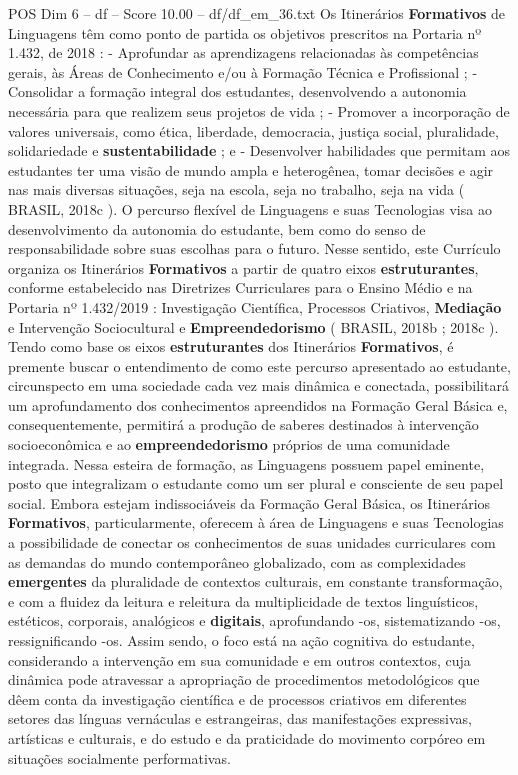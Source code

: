 \begin{textsample}{POS Dim 6 – df – Score 10.00 – df/df\_em\_36.txt}
Os Itinerários \textbf{Formativos} de Linguagens têm como ponto de partida os objetivos prescritos na Portaria nº 1.432, de 2018 : - Aprofundar as aprendizagens relacionadas às competências gerais, às Áreas de Conhecimento e/ou à Formação Técnica e Profissional ; - Consolidar a formação integral dos estudantes, desenvolvendo a autonomia necessária para que realizem seus projetos de vida ; - Promover a incorporação de valores universais, como ética, liberdade, democracia, justiça social, pluralidade, solidariedade e \textbf{sustentabilidade} ; e - Desenvolver habilidades que permitam aos estudantes ter uma visão de mundo ampla e heterogênea, tomar decisões e agir nas mais diversas situações, seja na escola, seja no trabalho, seja na vida ( BRASIL, 2018c ).
O percurso flexível de Linguagens e suas Tecnologias visa ao desenvolvimento da autonomia do estudante, bem como do senso de responsabilidade sobre suas escolhas para o futuro.
Nesse sentido, este Currículo organiza os Itinerários \textbf{Formativos} a partir de quatro eixos \textbf{estruturantes}, conforme estabelecido nas Diretrizes Curriculares para o Ensino Médio e na Portaria nº 1.432/2019 : Investigação Científica, Processos Criativos, \textbf{Mediação} e Intervenção Sociocultural e \textbf{Empreendedorismo} ( BRASIL, 2018b ; 2018c ).
Tendo como base os eixos \textbf{estruturantes} dos Itinerários \textbf{Formativos}, é premente buscar o entendimento de como este percurso apresentado ao estudante, circunspecto em uma sociedade cada vez mais dinâmica e conectada, possibilitará um aprofundamento dos conhecimentos apreendidos na Formação Geral Básica e, consequentemente, permitirá a produção de saberes destinados à intervenção socioeconômica e ao \textbf{empreendedorismo} próprios de uma comunidade integrada.
Nessa esteira de formação, as Linguagens possuem papel eminente, posto que integralizam o estudante como um ser plural e consciente de seu papel social.
Embora estejam indissociáveis da Formação Geral Básica, os Itinerários \textbf{Formativos}, particularmente, oferecem à área de Linguagens e suas Tecnologias a possibilidade de conectar os conhecimentos de suas unidades curriculares com as demandas do mundo contemporâneo globalizado, com as complexidades \textbf{emergentes} da pluralidade de contextos culturais, em constante transformação, e com a fluidez da leitura e releitura da multiplicidade de textos linguísticos, estéticos, corporais, analógicos e \textbf{digitais}, aprofundando -os, sistematizando -os, ressignificando -os.
Assim sendo, o foco está na ação cognitiva do estudante, considerando a intervenção em sua comunidade e em outros contextos, cuja dinâmica pode atravessar a apropriação de procedimentos metodológicos que dêem conta da investigação científica e de processos criativos em diferentes setores das línguas vernáculas e estrangeiras, das manifestações expressivas, artísticas e culturais, e do estudo e da praticidade do movimento corpóreo em situações socialmente performativas.

\end{textsample}
